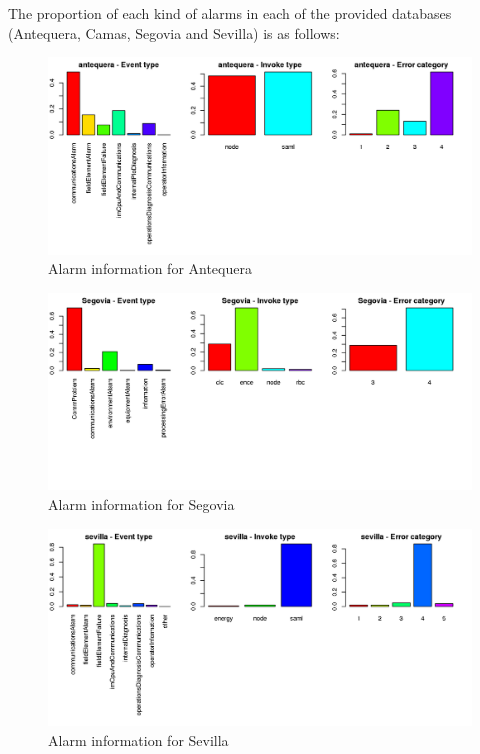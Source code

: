\documentclass[a4paper,10pt]{report}
\begin{document}
The proportion of each kind of alarms in each of the provided databases (Antequera, Camas, Segovia and Sevilla) is as follows:
\begin{figure}[ht!]
 \centering
 \includegraphics[width=\textwidth]{./img/antequera_graph.png}
 \caption{Alarm information for Antequera}
 \label{fig:anteq}
\end{figure}
\begin{figure}[ht!]
 \centering
 \includegraphics[width=\textwidth]{./img/segovia_graph.png}
 \caption{Alarm information for Segovia}
 \label{fig:segovia}
\end{figure}
\begin{figure}[ht!]
 \centering
 \includegraphics[width=\textwidth]{./img/sevilla_graph.png}
 \caption{Alarm information for Sevilla}
 \label{fig:sevilla}
\end{figure}
\end{document}
